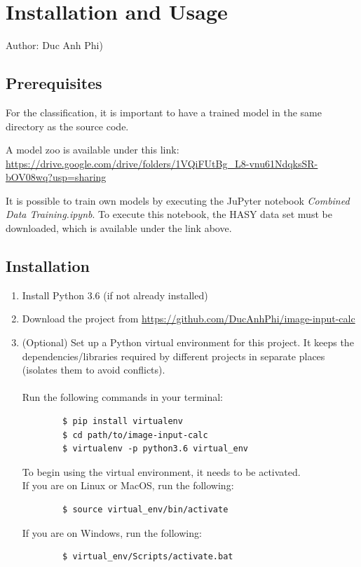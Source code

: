 \documentclass[11pt]{article}
\begin{document}
	\section{Installation and Usage}
	\small{Author: Duc Anh Phi)\\
	\subsection{Prerequisites}
	For the classification, it is important to have a trained model in the same directory as the source code.
	
	A model zoo is available under this link: \\
	\url{https://drive.google.com/drive/folders/1VQiFUtBg_L8-vnu61NdqksSR-bOV08wq?usp=sharing}
	
	It is possible to train own models by executing the JuPyter notebook \textit{Combined Data Training.ipynb}. To execute this notebook, the HASY data set must be downloaded, which is available under the link above.
	\subsection{Installation}
	\begin{enumerate}
		\item Install Python 3.6 (if not already installed)
		\item Download the project from \url{https://github.com/DucAnhPhi/image-input-calc}
		\item (Optional) Set up a Python virtual environment for this project. It keeps the dependencies/libraries required by different projects in separate places (isolates them to avoid conflicts). \\
		\\
		Run the following commands in your terminal:
		\begin{verbatim}
		$ pip install virtualenv
		$ cd path/to/image-input-calc
		$ virtualenv -p python3.6 virtual_env
		\end{verbatim}
		To begin using the virtual environment, it needs to be activated.
		\\
		If you are on Linux or MacOS, run the following:

		\begin{verbatim}
		$ source virtual_env/bin/activate
		\end{verbatim}

		If you are on Windows, run the following:

		\begin{verbatim}
		$ virtual_env/Scripts/activate.bat
		\end{verbatim}


\end{enumerate}}
\end{document}
